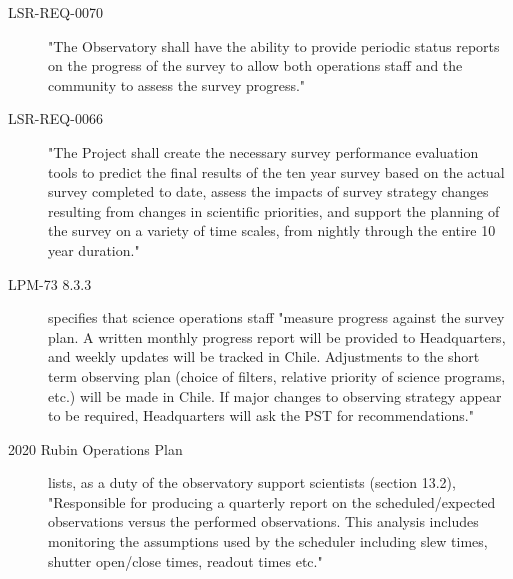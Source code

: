 \begin{description}
\begin{description}
\item[{LSR-REQ-0070}] "The Observatory shall have the ability to provide periodic status reports on the progress of the survey to allow both operations staff and the community to assess the survey progress."
\item[{LSR-REQ-0066}] "The Project shall create the necessary survey performance evaluation tools to predict the final results of the ten year survey based on the actual survey completed to date, assess the impacts of survey strategy changes resulting from changes in scientific priorities, and support the planning of the survey on a variety of time scales, from nightly through the entire 10 year duration."
\item[{LPM-73 8.3.3}] specifies that science operations staff "measure progress against the survey plan. A written monthly progress report will be provided to Headquarters, and weekly updates will be tracked in Chile. Adjustments to the short term observing plan (choice of filters, relative priority of science programs, etc.)  will be made in Chile. If major changes to observing strategy appear to be required, Headquarters will ask the PST for recommendations."
\item[{2020 Rubin Operations Plan}] lists, as a duty of the observatory support scientists (section 13.2), "Responsible for producing a quarterly report on the scheduled/expected observations versus the performed observations. This analysis includes monitoring the assumptions used by the scheduler including slew times, shutter open/close times, readout times etc."
\end{description}
\end{description}
